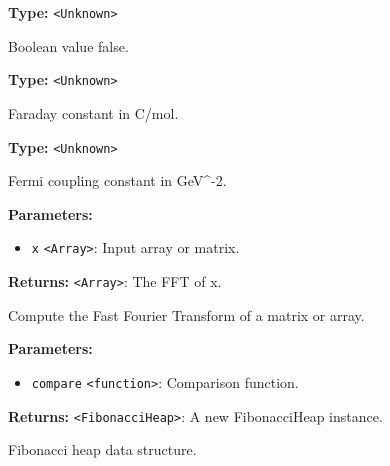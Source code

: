 \documentclass[12pt,a4paper]{article}
\begin{document}
\noindent \textbf{Type:} \texttt{<Unknown>}

\noindent Boolean value false.

\vspace{5mm}
\noindent {}\vspace{4mm}


\noindent \textbf{Type:} \texttt{<Unknown>}

\noindent Faraday constant in C/mol.

\vspace{5mm}
\noindent {}\vspace{4mm}


\noindent \textbf{Type:} \texttt{<Unknown>}

\noindent Fermi coupling constant in GeV\textasciicircum{}-2.

\vspace{5mm}
\noindent {}


\noindent \textbf{Parameters:}
\begin{itemize}
  \item \texttt{x} \texttt{<Array>}: Input array or matrix.
\end{itemize}

\noindent \textbf{Returns:} \texttt{<Array>}: The FFT of x.

\noindent Compute the Fast Fourier Transform of a matrix or array.

\vspace{5mm}
\noindent {}


\noindent \textbf{Parameters:}
\begin{itemize}
  \item \texttt{compare} \texttt{<function>}: Comparison function.
\end{itemize}

\noindent \textbf{Returns:} \texttt{<FibonacciHeap>}: A new FibonacciHeap instance.

\noindent Fibonacci heap data structure.

\vspace{5mm}
\noindent {}
\end{document}

